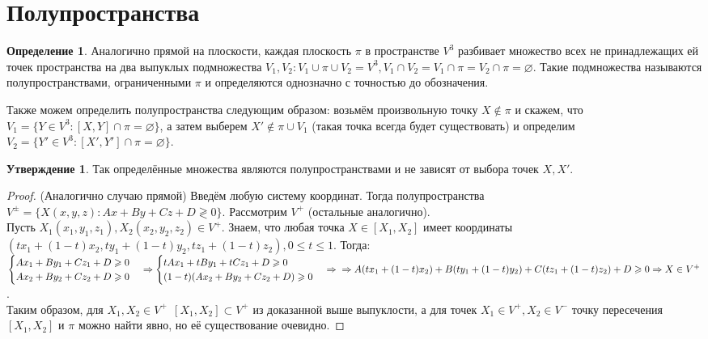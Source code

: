 \documentclass[a4paper, 12pt]{article}
\theoremstyle{definition}
\newtheorem*{definition}{Определение}
\newtheorem*{subtheorem}{Утверждение}
\begin{document}
	\section{Полупространства}
	\begin{definition}
		Аналогично прямой на плоскости, каждая плоскость $\pi$  в пространстве $V^3$ разбивает множество всех не принадлежащих ей точек пространства на два выпуклых подмножества $V_1, V_2: V_1 \cup \pi \cup V_2 = V^3, V_1 \cap V_2 = V_1 \cap \pi = V_2 \cap \pi = \varnothing$. Такие подмножества называются полупространствами, ограниченными $\pi$ и определяются однозначно с точностью до обозначения.
	\end{definition}
	Также можем определить полупространства следующим образом: возьмём произвольную точку $X \notin \pi$ и скажем, что $V_1 = \{Y \in V^3: [X, Y]\cap\pi = \varnothing\}$, а затем выберем $X' \notin \pi \cup V_1$ (такая точка всегда будет существовать) и определим $V_2 = \{Y' \in V^3: [X', Y']\cap\pi = \varnothing\}$.
	\begin{subtheorem}
		Так определённые множества являются полупространствами и не зависят от выбора точек $X, X'$.
	\end{subtheorem}
	\begin{proof}
		(Аналогично случаю прямой) Введём любую систему координат. Тогда полупространства $V^{\pm} = \{X(x, y, z): Ax + By + Cz + D \gtrless 0\}$. Рассмотрим $V^{+}$ (остальные аналогично).\\
		Пусть $X_{1}(x_{1}, y_{1}, z_1), X_{2}(x_{2}, y_{2}, z_2) \in V^{+}$. Знаем, что любая точка $X \in [X_{1}, X_{2}]$ имеет координаты $(tx_{1}+(1-t)x_{2}, ty_{1}+(1-t)y_{2}, tz_1+(1-t)z_2), 0 \leqslant t \leqslant 1$. Тогда:\\
		$\begin{cases}Ax_{1} + By_{1} + Cz_1 + D \geqslant 0 \\ Ax_{2} + By_{2} + Cz_2 + D \geqslant 0\end{cases} \Rightarrow \begin{cases}tAx_{1} + tBy_{1} + tCz_1 + D \geqslant 0 \\ (1-t)(Ax_{2} + By_{2} + Cz_2 + D) \geqslant 0\end{cases} \Rightarrow \\ \Rightarrow A(tx_{1}+(1-t)x_{2}) + B(ty_{1}+(1-t)y_{2}) + C(tz_1+(1-t)z_2) + D \geqslant 0 \Rightarrow X \in V^{+}$.\\
		Таким образом, для $X_1, X_2 \in V^{+} \ \ [X_1, X_2] \subset V^{+}$ из доказанной выше выпуклости, а для точек $X_1 \in V^{+}, X_{2} \in V^{-}$ точку пересечения $[X_1, X_2]$ и $\pi$ можно найти явно, но её существование очевидно.  
	\end{proof}
\end{document}
